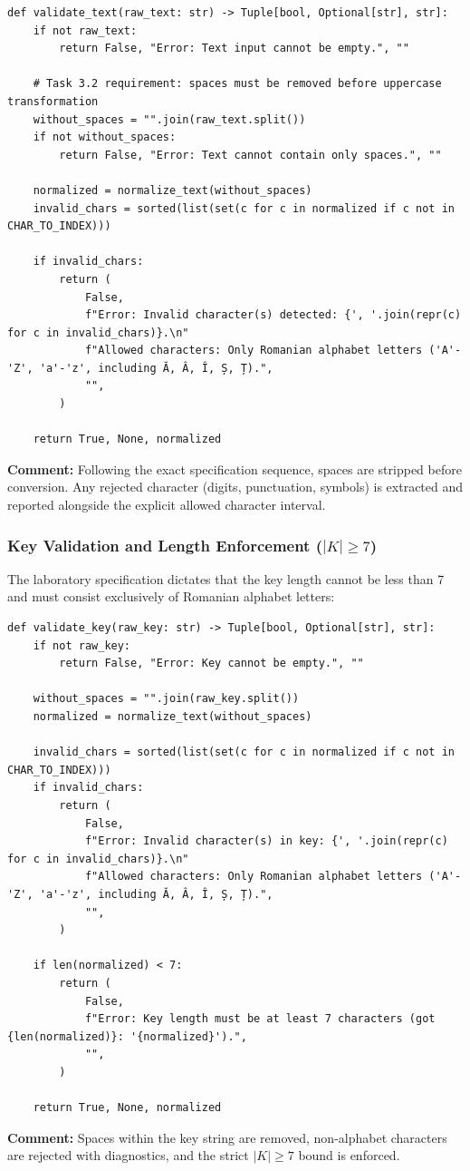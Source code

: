 \documentclass{labreport}
\begin{document}
\begin{lstlisting}[style=python]
def validate_text(raw_text: str) -> Tuple[bool, Optional[str], str]:
    if not raw_text:
        return False, "Error: Text input cannot be empty.", ""

    # Task 3.2 requirement: spaces must be removed before uppercase transformation
    without_spaces = "".join(raw_text.split())
    if not without_spaces:
        return False, "Error: Text cannot contain only spaces.", ""

    normalized = normalize_text(without_spaces)
    invalid_chars = sorted(list(set(c for c in normalized if c not in CHAR_TO_INDEX)))

    if invalid_chars:
        return (
            False,
            f"Error: Invalid character(s) detected: {', '.join(repr(c) for c in invalid_chars)}.\n"
            f"Allowed characters: Only Romanian alphabet letters ('A'-'Z', 'a'-'z', including Ă, Â, Î, Ș, Ț).",
            "",
        )

    return True, None, normalized
\end{lstlisting}
\textbf{Comment:} Following the exact specification sequence, spaces are stripped before conversion. Any rejected character (digits, punctuation, symbols) is extracted and reported alongside the explicit allowed character interval.

\subsubsection[Key Validation and Length Enforcement (|K| >= 7)]{Key Validation and Length Enforcement ($|K| \ge 7$)}
The laboratory specification dictates that the key length cannot be less than 7 and must consist exclusively of Romanian alphabet letters:

\begin{lstlisting}[style=python]
def validate_key(raw_key: str) -> Tuple[bool, Optional[str], str]:
    if not raw_key:
        return False, "Error: Key cannot be empty.", ""

    without_spaces = "".join(raw_key.split())
    normalized = normalize_text(without_spaces)

    invalid_chars = sorted(list(set(c for c in normalized if c not in CHAR_TO_INDEX)))
    if invalid_chars:
        return (
            False,
            f"Error: Invalid character(s) in key: {', '.join(repr(c) for c in invalid_chars)}.\n"
            f"Allowed characters: Only Romanian alphabet letters ('A'-'Z', 'a'-'z', including Ă, Â, Î, Ș, Ț).",
            "",
        )

    if len(normalized) < 7:
        return (
            False,
            f"Error: Key length must be at least 7 characters (got {len(normalized)}: '{normalized}').",
            "",
        )

    return True, None, normalized
\end{lstlisting}
\textbf{Comment:} Spaces within the key string are removed, non-alphabet characters are rejected with diagnostics, and the strict $|K| \ge 7$ bound is enforced.
\end{document}
